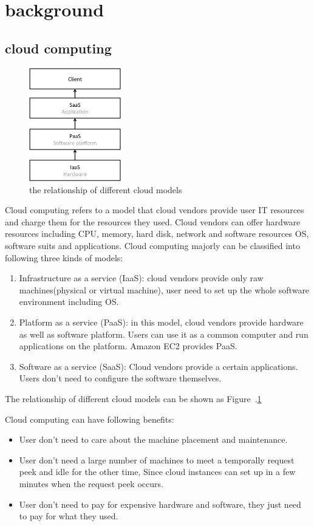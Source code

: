 \section{background}
\label{sec:background}
\subsection{cloud computing}
\begin{figure}
\centering
\includegraphics[width=4cm]{img/cloud_models}
\caption{the relationship of different cloud models}
\label{background:cloud models}
\end{figure}

Cloud computing refers to a model that cloud vendors provide user IT resources and charge them for
the resources they used.
Cloud vendors can offer hardware resources including CPU, memory, hard disk, network and software
resources OS, software suits and applications.
Cloud computing majorly can be classified into following three kinds of models:
\begin{enumerate}
  \item Infrastructure as a service (IaaS): cloud vendors provide only raw machines(physical or
  virtual machine), user need to set up the whole software environment including OS.
  \item Platform as a service (PaaS): in this model, cloud vendors provide hardware as well as
  software platform. Users can use it as a common computer and run applications on the platform.
  Amazon EC2 provides PaaS.
  \item Software as a service (SaaS): Cloud vendors provide a certain applications. Users don't need
  to configure the software themselves.
\end{enumerate}
The relationship of different cloud models can be shown as Figure~.\ref{background:cloud models}

Cloud computing can have following benefits:
\begin{itemize}
  \item User don't need to care about the machine placement and maintenance.
  \item User don't need a large number of machines to meet a temporally request peek and idle for
  the other time, Since cloud instances can set up in a few minutes when the request peek occurs.
  \item User don't need to pay for expensive hardware and software, they just need to pay for what
  they used.
\end{itemize}

